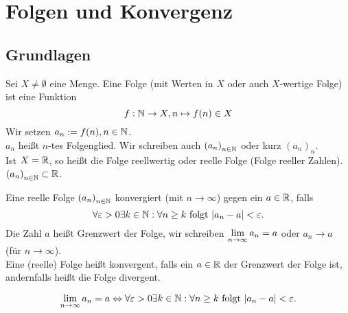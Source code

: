 \documentclass[../ana1.tex]{subfiles}
\begin{document}
\setcounter{section}{6}

\section{Folgen und Konvergenz}
\subsection{Grundlagen}
\begin{defi}
	Sei \(X\neq\emptyset \) eine Menge. Eine Folge (mit Werten in \(X\) oder auch \(X\)-wertige Folge) ist eine Funktion 
	\[f: \mathbb{N} \rightarrow X, n \mapsto f(n)\in X\]
	Wir setzen \(a_n := f(n), n\in\mathbb{N} \).\\
	\(a_n\) heißt \(n\)-tes Folgenglied. Wir schreiben auch \({(a_n)}_{n\in\mathbb{N}}\) oder kurz \({(a_n)}_n\).\\
	Ist \(X = \mathbb{R} \), so heißt die Folge reellwertig oder reelle Folge (Folge reeller Zahlen). \({(a_n)}_{n\in\mathbb{N}} \subset \mathbb{R} \).
\end{defi}
\begin{defi}
	Eine reelle Folge \({(a_n)}_{n\in\mathbb{N}}\) konvergiert (mit \(n\rightarrow\infty \)) gegen ein \(a\in\mathbb{R} \), falls 
	\[\forall \varepsilon > 0 \exists k \in \mathbb{N}: \forall n\geq k \text{ folgt } |a_n - a| < \varepsilon.\]
	Die Zahl \(a\) heißt Grenzwert der Folge, wir schreiben \(\lim\limits_{n\rightarrow\infty}a_n = a\) oder \(a_n\rightarrow a\) (für \(n\rightarrow\infty \)).\\
	Eine (reelle) Folge heißt konvergent, falls ein \(a\in\mathbb{R} \) der Grenzwert der Folge ist, andernfalls heißt die Folge divergent.
\end{defi}
\begin{bem}
	\[\lim\limits_{n\rightarrow\infty}a_n = a \Leftrightarrow \forall \varepsilon > 0 \exists k\in\mathbb{N}: \forall n\geq k \text{ folgt } |a_n -a|< \varepsilon.\]
\end{bem}
\end{document}
